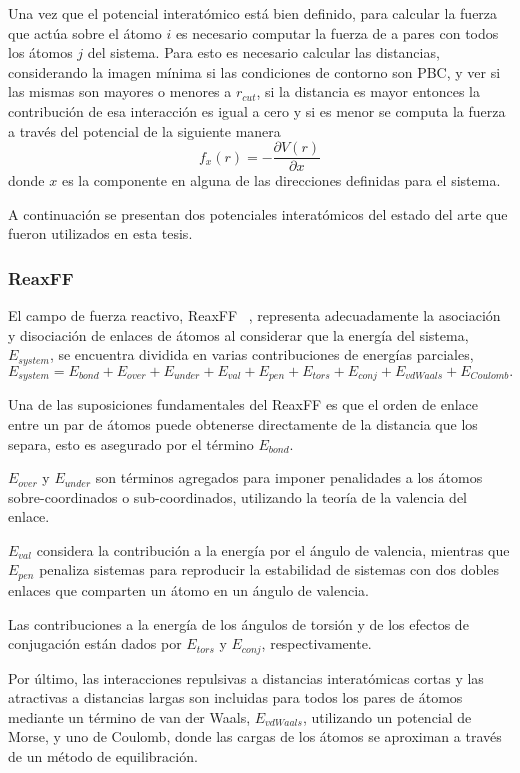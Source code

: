 Una vez que el potencial interatómico está bien definido, para calcular la fuerza
que actúa sobre el átomo $i$ es necesario computar la fuerza de a pares con todos
los átomos $j$ del sistema. Para esto es necesario calcular las distancias,
considerando la imagen mínima si las condiciones de contorno son PBC, y ver si
las mismas son mayores o menores a $r_{cut}$, si la distancia es mayor entonces
la contribución de esa interacción es igual a cero y si es menor se computa la 
fuerza a través del potencial de la siguiente manera
$$
f_x(r) = - \frac{\partial V(r)}{\partial x}
$$
donde $x$ es la componente en alguna de las direcciones definidas para el sistema.

A continuación se presentan dos potenciales interatómicos del estado del arte que
fueron utilizados en esta tesis.

\subsubsection{ReaxFF}\label{s:reaxff}

El campo de fuerza reactivo, ReaxFF ~\cite{reaxff}, representa adecuadamente la
asociación y disociación de enlaces de átomos al considerar que la energía del 
sistema, $E_{system}$, se encuentra dividida en varias contribuciones de energías
parciales,
$$
E_{system} = E_{bond} + E_{over} + E_{under} + E_{val} + E_{pen} + E_{tors} + E_{conj} + E_{vdWaals} + E_{Coulomb}.
$$

Una de las suposiciones fundamentales del ReaxFF es que el orden de enlace entre
un par de átomos puede obtenerse directamente de la distancia que los separa, 
esto es asegurado por el término $E_{bond}$.

$E_{over}$ y $E_{under}$ son términos agregados para imponer penalidades a los
átomos sobre-coordinados o sub-coordinados, utilizando la teoría de la valencia 
del enlace.

$E_{val}$ considera la contribución a la energía por el ángulo de valencia, 
mientras que $E_{pen}$ penaliza sistemas para reproducir la estabilidad de 
sistemas con dos dobles enlaces que comparten un átomo en un ángulo de valencia.

Las contribuciones a la energía de los ángulos de torsión y de los efectos de 
conjugación están dados por $E_{tors}$ y $E_{conj}$, respectivamente.

Por último, las interacciones repulsivas a distancias interatómicas cortas y 
las atractivas a distancias largas son incluidas para todos los pares de átomos
mediante un término de van der Waals, $E_{vdWaals}$, utilizando un potencial de 
Morse, y uno de Coulomb, donde las cargas de los átomos se aproximan a través de 
un método de equilibración.

